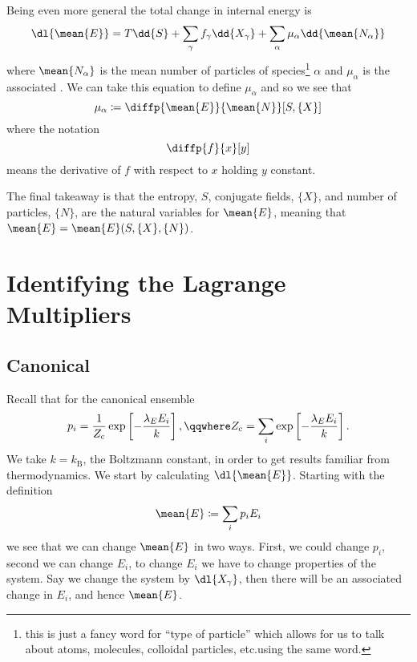 \documentclass[fleqn]{NotesClass}
\newcommand*{\boltzmann}{k_{\mathrm{B}}}
\newcommand*{\cpartition}{Z_{\mathrm{c}}}
\begin{document}
    Being even more general the total change in internal energy is
    \begin{equation}
        \dl{\mean{E}} = T \dd{S} + \sum_{\gamma} f_\gamma \dd{X_\gamma} + \sum_{\alpha} \mu_\alpha \dd{\mean{N_\alpha}}
    \end{equation}
    where \(\mean{N_\alpha}\) is the mean number of particles of species\footnote{this is just a fancy word for \enquote{type of particle} which allows for us to talk about atoms, molecules, colloidal particles, etc.\@ using the same word.} \(\alpha\) and \(\mu_\alpha\) is the associated .
    We can take this equation to define \(\mu_\alpha\) and so we see that
    \begin{equation}
        \mu_\alpha \coloneqq \diffp{\mean{E}}{\mean{N}}[S,\{X\}]
    \end{equation}
    where the notation
    \begin{equation}
        \diffp{f}{x}[y]
    \end{equation}
    means the derivative of \(f\) with respect to \(x\) holding \(y\) constant.
        
    The final takeaway is that the entropy, \(S\), conjugate fields, \(\{X\}\), and number of particles, \(\{N\}\), are the natural variables for \(\mean{E}\), meaning that \(\mean{E} = \mean{E}(S, \{X\}, \{N\})\).
    
    \section{Identifying the Lagrange Multipliers}
    \subsection{Canonical}
    Recall that for the canonical ensemble
    \begin{equation}
        p_i = \frac{1}{\cpartition} \exp\left[ -\frac{\lambda_E E_i}{k} \right], \qqwhere \cpartition = \sum_i \exp\left[ -\frac{\lambda_E E_i}{k} \right].
    \end{equation}
    We take \(k = \boltzmann\), the Boltzmann constant, in order to get results familiar from thermodynamics.
    We start by calculating \(\dl{\mean{E}}\).
    Starting with the definition
    \begin{equation}
        \mean{E} \coloneqq \sum_i p_i E_i
    \end{equation}
    we see that we can change \(\mean{E}\) in two ways.
    First, we could change \(p_i\), second we can change \(E_i\), to change \(E_i\) we have to change properties of the system.
    Say we change the system by \(\dl{X_\gamma}\), then there will be an associated change in \(E_i\), and hence \(\mean{E}\).
    
\end{document}
